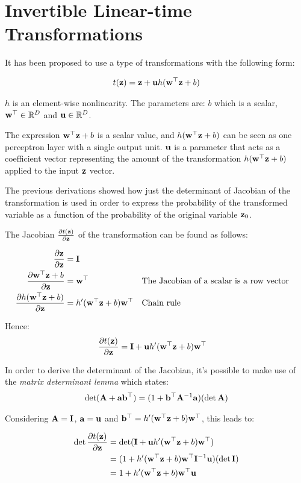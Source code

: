 \section{Invertible Linear-time Transformations}

It has been proposed\cite{1505.05770} to use a type of transformations with the following form:

\begin{align}
t(\mathbf{z}) = \mathbf{z} + \mathbf{u} h({\mathbf{w}}^{\top} \mathbf{z} + b)
\end{align}

$h$ is an element-wise nonlinearity. 
The parameters are: $b$ which is a scalar, 
${\mathbf{w}}^{\top} \in \mathbb{R}^D$ and $\mathbf{u} \in \mathbb{R}^D$.

The expression ${\mathbf{w}}^{\top} \mathbf{z} + b$ is a scalar value,
and $h({\mathbf{w}}^{\top} \mathbf{z} + b)$ can be seen as one perceptron layer
with a single output unit. 
$\mathbf{u}$ is a parameter that acts as a coefficient vector
representing the amount of the transformation $h({\mathbf{w}}^{\top} \mathbf{z} + b)$
applied to the input $\mathbf{z}$ vector.

The previous derivations showed how just the 
determinant of Jacobian of the transformation
is used in order to express the probability of the transformed variable
as a function of the probability of the original variable $\mathbf{z}_0$.

The Jacobian $\frac{\partial t(\mathbf{z})}{\partial \mathbf{z}}$ of the transformation can be found as follows:

\begin{align*}
\frac{\partial \mathbf{z}}{\partial \mathbf{z}} &= \mathbf{I} \\
\frac{\partial {\mathbf{w}}^{\top} \mathbf{z} + b}{\partial \mathbf{z}} &= {\mathbf{w}}^{\top} && \text{The Jacobian of a scalar is a row vector} \\
\frac{\partial h({\mathbf{w}}^{\top} \mathbf{z} + b)}{\partial \mathbf{z}} &= h^\prime ({\mathbf{w}}^{\top} \mathbf{z} + b){\mathbf{w}}^{\top} && \text{Chain rule}
\end{align*}

Hence:
\begin{align}
\frac{\partial t(\mathbf{z})}{\partial \mathbf{z}} &= \mathbf{I} + \mathbf{u} h^\prime({\mathbf{w}}^{\top} \mathbf{z} + b){\mathbf{w}}^{\top}
\end{align}

In order to derive the determinant of the Jacobian, it's possible to make use of the
\emph{matrix determinant lemma} which states:
\begin{align}
    \det ( \mathbf{A} + \mathbf{a} {\mathbf{b}}^{\top} ) = (1 + {\mathbf{b}}^{\top} \mathbf{A}^{-1} \mathbf{a})(\det \mathbf{A})
\end{align}

Considering $\mathbf{A} = \mathbf{I}$, $\mathbf{a} = \mathbf{u}$ and ${\mathbf{b}}^{\top} = h^\prime({\mathbf{w}}^{\top} \mathbf{z} + b){\mathbf{w}}^{\top}$,
this leads to:

\begin{align}
\det \frac{\partial t(\mathbf{z})}{\partial \mathbf{z}} &= \det(\mathbf{I} + \mathbf{u} h^\prime({\mathbf{w}}^{\top} \mathbf{z} + b) {\mathbf{w}}^{\top})\\ 
&= (1 + h^\prime({\mathbf{w}}^{\top} \mathbf{z} + b){\mathbf{w}}^{\top} \mathbf{I}^{-1} \mathbf{u})(\det \mathbf{I})\\
 &=1 + h^\prime({\mathbf{w}}^{\top} \mathbf{z} + b){\mathbf{w}}^{\top} \mathbf{u}
\end{align}

